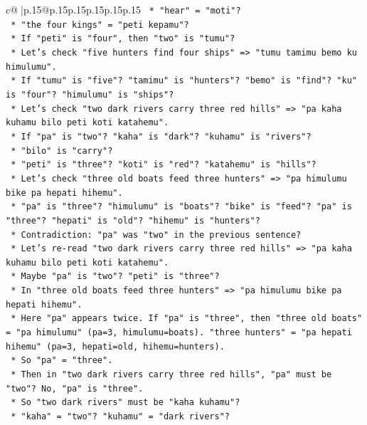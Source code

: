\documentclass{article}
\begin{document}
{\begin{supertabular}{c@{$\;$}|p{.15\linewidth}@{}p{.15\linewidth}p{.15\linewidth}p{.15\linewidth}p{.15\linewidth}p{.15\linewidth}}
{{{\texttt{        *   "hear" = "moti"?} \\
\texttt{        *   "the four kings" = "peti kepamu"?} \\
\texttt{        *   If "peti" is "four", then "two" is "tumu"?} \\
\texttt{        *   Let's check "five hunters find four ships" => "tumu tamimu bemo ku himulumu".} \\
\texttt{        *   If "tumu" is "five"? "tamimu" is "hunters"? "bemo" is "find"? "ku" is "four"? "himulumu" is "ships"?} \\
\texttt{        *   Let's check "two dark rivers carry three red hills" => "pa kaha kuhamu bilo peti koti katahemu".} \\
\texttt{        *   If "pa" is "two"? "kaha" is "dark"? "kuhamu" is "rivers"?} \\
\texttt{        *   "bilo" is "carry"?} \\
\texttt{        *   "peti" is "three"? "koti" is "red"? "katahemu" is "hills"?} \\
\texttt{        *   Let's check "three old boats feed three hunters" => "pa himulumu bike pa hepati hihemu".} \\
\texttt{        *   "pa" is "three"? "himulumu" is "boats"? "bike" is "feed"? "pa" is "three"? "hepati" is "old"? "hihemu" is "hunters"?} \\
\texttt{        *   Contradiction: "pa" was "two" in the previous sentence?} \\
\texttt{        *   Let's re{-}read "two dark rivers carry three red hills" => "pa kaha kuhamu bilo peti koti katahemu".} \\
\texttt{        *   Maybe "pa" is "two"? "peti" is "three"?} \\
\texttt{        *   In "three old boats feed three hunters" => "pa himulumu bike pa hepati hihemu".} \\
\texttt{        *   Here "pa" appears twice. If "pa" is "three", then "three old boats" = "pa himulumu" (pa=3, himulumu=boats). "three hunters" = "pa hepati hihemu" (pa=3, hepati=old, hihemu=hunters).} \\
\texttt{        *   So "pa" = "three".} \\
\texttt{        *   Then in "two dark rivers carry three red hills", "pa" must be "two"? No, "pa" is "three".} \\
\texttt{        *   So "two dark rivers" must be "kaha kuhamu"?} \\
\texttt{        *   "kaha" = "two"? "kuhamu" = "dark rivers"?} \\
}}}
\end{supertabular}}
\end{document}
